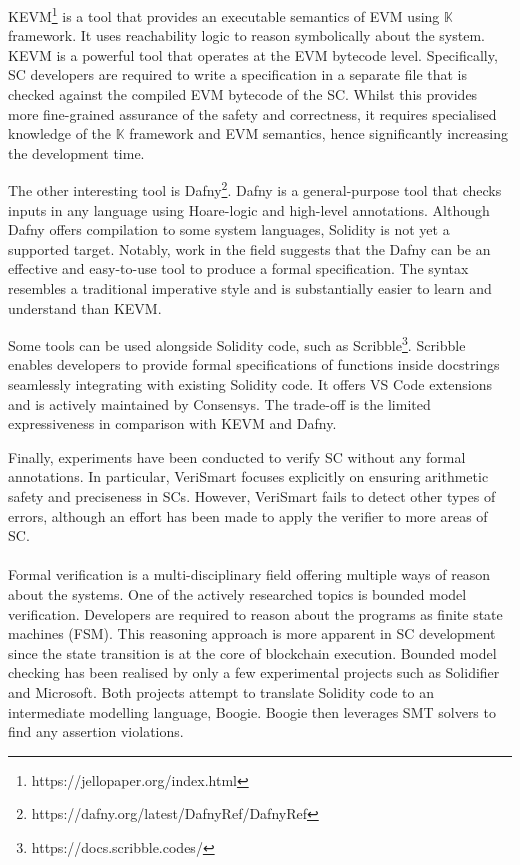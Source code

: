 \documentclass[oneside]{ecsproject}     %
\begin{document}
KEVM\footnote{https://jellopaper.org/index.html} is a tool that provides an executable semantics of EVM using $\mathbb{K}$ framework. 
It uses reachability logic to reason symbolically about the system\cite{kevm}. KEVM is a powerful tool that operates at the EVM bytecode level.
Specifically, SC developers are required to write a specification in a separate file that is checked against the compiled EVM bytecode of the SC.
Whilst this provides more fine-grained assurance of the safety and correctness, it requires specialised knowledge of the $\mathbb{K}$ framework and EVM
semantics, hence significantly increasing the development time.

The other interesting tool is Dafny\footnote{https://dafny.org/latest/DafnyRef/DafnyRef}. Dafny is a general-purpose tool that checks inputs in any language 
using Hoare-logic and high-level annotations. Although Dafny offers compilation to some system languages, Solidity is not yet a supported target. 
Notably, work in the field suggests that the Dafny can be an effective and easy-to-use tool to produce a formal specification\cite{dafny_deductive}.
The syntax resembles a traditional imperative style and is substantially easier to learn and understand than KEVM.

Some tools can be used alongside Solidity code, such as Scribble\footnote{https://docs.scribble.codes/}. 
Scribble enables developers to provide formal specifications of functions inside docstrings seamlessly integrating with existing Solidity code. 
It offers VS Code extensions and is actively maintained by Consensys. 
The trade-off is the limited expressiveness in comparison with KEVM and Dafny.

Finally, experiments have been conducted to verify SC without any formal annotations. 
In particular, VeriSmart focuses explicitly on ensuring arithmetic safety and preciseness in SCs\cite{so2019verismart}. 
However, VeriSmart fails to detect other types of errors, 
although an effort has been made to apply the verifier to more areas of SC.

\paragraph*{}
Formal verification is a multi-disciplinary field offering multiple ways of reason about the systems. One of the actively researched topics
is bounded model verification\cite{SMBC}. Developers are required to reason about the programs as finite state machines (FSM).
This reasoning approach is more apparent in SC development since the state transition is at the core of blockchain execution.
Bounded model checking has been realised by only a few experimental projects such as Solidifier\cite{solidifer} and Microsoft\cite{azure}.
Both projects attempt to translate Solidity code to an intermediate modelling language, Boogie\cite{boogie}. Boogie then leverages
SMT solvers to find any assertion violations.
\end{document}
